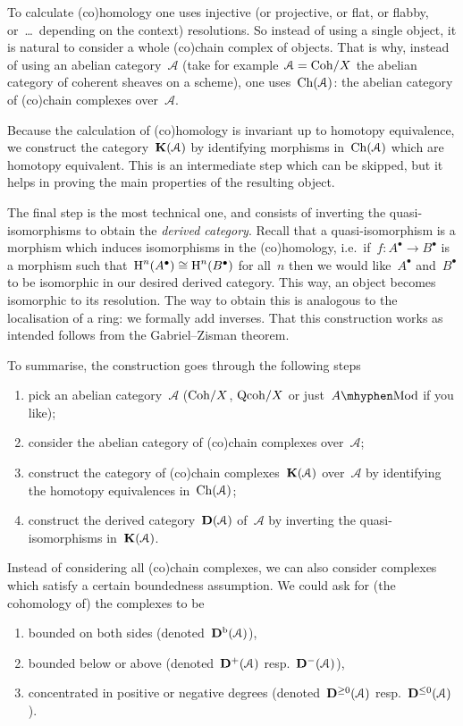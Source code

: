 To calculate (co)homology one uses injective (or projective, or flat, or flabby, or~\dots\ depending on the context) resolutions. So instead of using a single object, it is natural to consider a whole (co)chain complex of objects. That is why, instead of using an abelian category~$\mathcal{A}$ (take for example~$\mathcal{A}=\mathrm{Coh}/X$ the abelian category of coherent sheaves on a scheme), one uses~$\operatorname{Ch}(\mathcal{A})$: the abelian category of (co)chain complexes over~$\mathcal{A}$.

Because the calculation of (co)homology is invariant up to homotopy equivalence, we construct the category~$\mathbf{K}(\mathcal{A})$ by identifying morphisms in~$\operatorname{Ch}(\mathcal{A})$ which are homotopy equivalent. This is an intermediate step which can be skipped, but it helps in proving the main properties of the resulting object.

The final step is the most technical one, and consists of inverting the quasi-isomorphisms to obtain the \emph{derived category}. Recall that a quasi-isomorphism is a morphism which induces isomorphisms in the (co)homology, i.e.\ if~$f\colon A^\bullet\to B^\bullet$ is a morphism such that~$\operatorname{H}^n(A^\bullet)\cong\operatorname{H}^n(B^\bullet)$ for all~$n$ then we would like~$A^\bullet$ and~$B^\bullet$ to be isomorphic in our desired derived category. This way, an object becomes isomorphic to its resolution. The way to obtain this is analogous to the localisation of a ring: we formally add inverses. That this construction works as intended follows from the Gabriel--Zisman theorem.

To summarise, the construction goes through the following steps
\begin{enumerate}
  \item pick an abelian category~$\mathcal{A}$ ($\mathrm{Coh}/X$, $\mathrm{Qcoh}/X$ or just~$A\mhyphen\mathrm{Mod}$ if you like);
  \item consider the abelian category of (co)chain complexes over~$\mathcal{A}$;
  \item construct the category of (co)chain complexes~$\mathbf{K}(\mathcal{A})$ over~$\mathcal{A}$ by identifying the homotopy equivalences in~$\operatorname{Ch}(\mathcal{A})$;
  \item construct the derived category~$\mathbf{D}(\mathcal{A})$ of~$\mathcal{A}$ by inverting the quasi-isomorphisms in~$\mathbf{K}(\mathcal{A})$.
\end{enumerate}
Instead of considering all (co)chain complexes, we can also consider complexes which satisfy a certain boundedness assumption. We could ask for (the cohomology of) the complexes to be
\begin{enumerate}
  \item bounded on both sides (denoted~$\mathbf{D}^{\mathrm{b}}(\mathcal{A})$),
  \item bounded below or above (denoted~$\mathbf{D}^+(\mathcal{A})$ resp.\ $\mathbf{D}^-(\mathcal{A})$),
  \item concentrated in positive or negative degrees (denoted~$\mathbf{D}^{\geq 0}(\mathcal{A})$ resp.\ $\mathbf{D}^{\leq 0}(\mathcal{A})$).
\end{enumerate}


